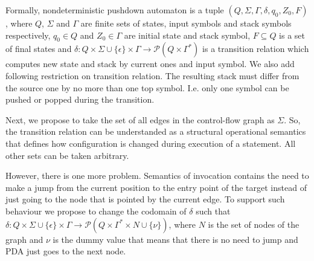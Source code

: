 Formally, nondeterministic pushdown automaton is a tuple $(Q, \Sigma, \Gamma, \delta, q_0, Z_0, F)$, where $Q$, $\Sigma$ and $\Gamma$ are finite sets of states, input symbols and stack symbols respectively, $q_0 \in Q$ and $Z_0 \in \Gamma$ are initial state and stack symbol, $F \subseteq Q$ is a set of final states and $\delta: Q \times \Sigma \cup \{\epsilon\} \times \Gamma \rightarrow \mathcal P (Q \times \Gamma^*)$ is a transition relation which computes new state and stack by current ones and input symbol.
We also add following restriction on transition relation.
The resulting stack must differ from the source one by no more than one top symbol. I.e. only one symbol can be pushed or popped during the transition.

Next, we propose to take the set of all edges in the control-flow graph as $\Sigma$.
So, the transition relation can be understanded as a structural operational semantics that defines how configuration is changed during execution of a statement.
All other sets can be taken arbitrary.

However, there is one more problem.
Semantics of invocation contains the need to make a jump from the current position to the entry point of the target instead of just going to the node that is pointed by the current edge.
To support such behaviour we propose to change the codomain of $\delta$ such that $\delta: Q \times \Sigma \cup \{\epsilon\} \times \Gamma \rightarrow \mathcal P (Q \times \Gamma^* \times N \cup \{\nu\})$, where $N$ is the set of nodes of the graph and $\nu$ is the dummy value that means that there is no need to jump and PDA just goes to the next node.

